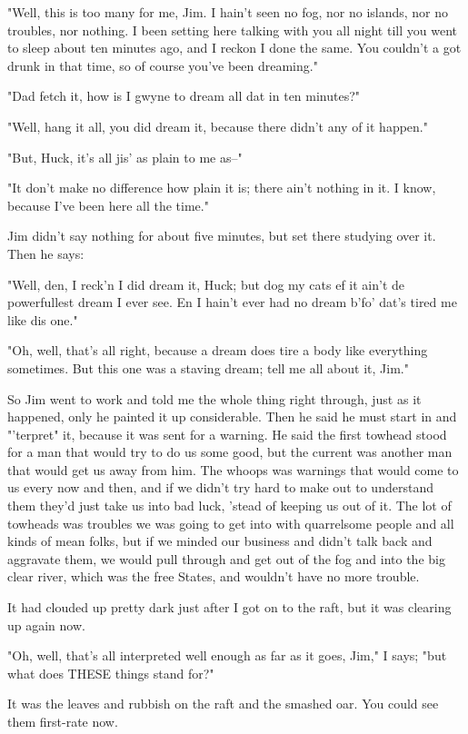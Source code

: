 "Well, this is too many for me, Jim.  I hain't seen no fog, nor no
islands, nor no troubles, nor nothing.  I been setting here talking with
you all night till you went to sleep about ten minutes ago, and I reckon
I done the same.  You couldn't a got drunk in that time, so of course
you've been dreaming."

"Dad fetch it, how is I gwyne to dream all dat in ten minutes?"

"Well, hang it all, you did dream it, because there didn't any of it
happen."

"But, Huck, it's all jis' as plain to me as--"

"It don't make no difference how plain it is; there ain't nothing in it.
I know, because I've been here all the time."

Jim didn't say nothing for about five minutes, but set there studying
over it.  Then he says:

"Well, den, I reck'n I did dream it, Huck; but dog my cats ef it ain't de
powerfullest dream I ever see.  En I hain't ever had no dream b'fo' dat's
tired me like dis one."

"Oh, well, that's all right, because a dream does tire a body like
everything sometimes.  But this one was a staving dream; tell me all
about it, Jim."

So Jim went to work and told me the whole thing right through, just as it
happened, only he painted it up considerable.  Then he said he must start
in and "'terpret" it, because it was sent for a warning.  He said the
first towhead stood for a man that would try to do us some good, but the
current was another man that would get us away from him.  The whoops was
warnings that would come to us every now and then, and if we didn't try
hard to make out to understand them they'd just take us into bad luck,
'stead of keeping us out of it.  The lot of towheads was troubles we was
going to get into with quarrelsome people and all kinds of mean folks,
but if we minded our business and didn't talk back and aggravate them, we
would pull through and get out of the fog and into the big clear river,
which was the free States, and wouldn't have no more trouble.

It had clouded up pretty dark just after I got on to the raft, but it was
clearing up again now.

"Oh, well, that's all interpreted well enough as far as it goes, Jim," I
says; "but what does THESE things stand for?"

It was the leaves and rubbish on the raft and the smashed oar.  You could
see them first-rate now.

